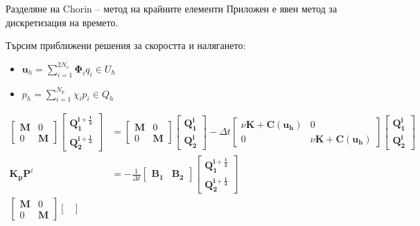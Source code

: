 \documentclass{beamer}
\newcommand{\vecf}[1]{\boldsymbol{#1}}
\begin{document}
    \begin{frame}{Разделяне на Chorin -- метод на крайните елементи}
    Приложен е явен метод за дискретизация на времето.
    
        	Търсим приближени решения за скоростта и налягането:
    		\begin{itemize}
    			\item $\mathbf{u}_h = \sum\limits_{i=1}^{2N_v}{\mathbf{\Phi}_iq_i} \in U_h$
    			\item $p_h = \sum\limits_{i=1}^{N_p}{\chi_ip_i} \in Q_h$
		\end{itemize}
		\small
		\begin{equation*}
		\begin{aligned}
	\begin{bmatrix}
		\mathbf{M} & 0 \\
		0 & \mathbf{M}
	\end{bmatrix}
	\begin{bmatrix}
		\vecf{Q^{i + \frac{1}{2}}_1} \\
		\vecf{Q^{i + \frac{1}{2}}_2}
	\end{bmatrix} &=
	\begin{bmatrix}
		\mathbf{M} & 0 \\
		0 & \mathbf{M}
	\end{bmatrix}
	\begin{bmatrix}
		\vecf{Q^{i}_1} \\
		\vecf{Q^{i}_2}
	\end{bmatrix} - \Delta t \begin{bmatrix}
		\nu \mathbf{K} + \mathbf{C}(\vecf{u_h}) & 0 \\
		0 & \nu \mathbf{K} + \mathbf{C}(\vecf{u_h})
	\end{bmatrix} \begin{bmatrix}
		\vecf{Q^i_1} \\
		\vecf{Q^i_2}
	\end{bmatrix} \\
	\mathbf{K_p}\vecf{P}^i &= -\frac{1}{\Delta t} \begin{bmatrix}
		\mathbf{B_1} & \mathbf{B_2}
	\end{bmatrix} \begin{bmatrix}
		\vecf{Q^{i + \frac{1}{2}}_1} \\
		\vecf{Q^{i + \frac{1}{2}}_2}
	\end{bmatrix} \\
	\begin{bmatrix}
		\mathbf{M} & 0 \\
		0 & \mathbf{M}
	\end{bmatrix} \begin{bmatrix}

\end{bmatrix}
\end{aligned}
\end{equation*}
\end{frame}
\end{document}
